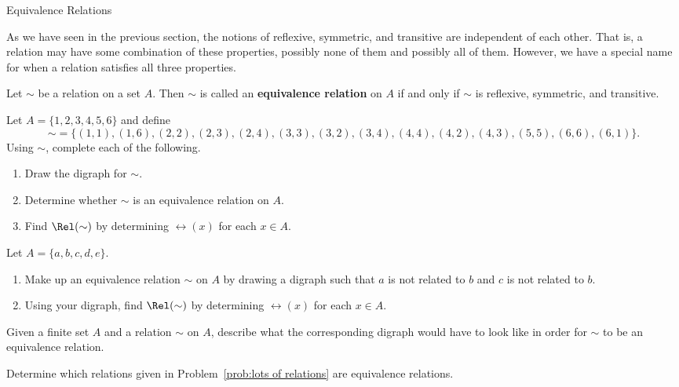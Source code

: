 \begin{section}{Equivalence Relations}

As we have seen in the previous section, the notions of reflexive, symmetric, and transitive are independent of each other. That is, a relation may have some combination of these properties, possibly none of them and possibly all of them.  However, we have a special name for when a relation satisfies all three properties.

\begin{definition}
Let $\sim$ be a relation on a set $A$.  Then $\sim$ is called an \textbf{equivalence relation} on $A$ if and only if $\sim$ is reflexive, symmetric, and transitive.
\end{definition}

\begin{problem}\label{prob:digraph}
Let $A=\{1,2,3,4,5,6\}$ and define
\[
{\sim}=\{(1,1),(1,6),(2,2),(2,3),(2,4),(3,3),(3,2),(3,4),(4,4),(4,2),(4,3),(5,5),(6,6),(6,1)\}.
\]
Using $\sim$, complete each of the following.
\begin{enumerate}[label=\textrm{(\alph*)}]
\item Draw the digraph for $\sim$.
\item Determine whether $\sim$ is an equivalence relation on $A$.
\item Find $\Rel(\sim)$ by determining $\rel(x)$ for each $x\in A$.
\end{enumerate}
\end{problem}

\begin{problem}\label{prob:made up}
Let $A=\{a,b,c,d,e\}$.  
\begin{enumerate}[label=\textrm{(\alph*)}]
\item Make up an equivalence relation $\sim$ on $A$ by drawing a digraph such that $a$ is not related to $b$ and $c$ is not related to $b$.  
\item Using your digraph, find $\Rel(\sim)$ by determining $\rel(x)$ for each $x\in A$.
\end{enumerate}
\end{problem}

\begin{problem}
Given a finite set $A$ and a relation $\sim$ on $A$, describe what the corresponding digraph would have to look like in order for $\sim$ to be an equivalence relation.
\end{problem}

\begin{problem}\label{prob:equiv from lots of relations}
Determine which relations given in Problem~\ref{prob:lots of relations} are equivalence relations.
\end{problem}


\end{section}
